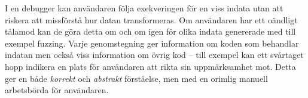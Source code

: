 I en debugger kan användaren följa exekveringen för en viss indata utan att riskera att missförstå
hur datan transformeras. Om användaren har ett oändligt tålamod kan de göra detta om och om igen för
olika indata genererade med till exempel fuzzing. Varje genomstegning ger information om koden som
behandlar indatan men också viss information om övrig kod -- till exempel kan ett svårtaget hopp
indikera en plats för användaren att rikta sin uppmärksamhet mot. Detta ger en både \textit{korrekt}
och \textit{abstrakt} förståelse, men med en orimlig manuell arbetsbörda för användaren.

